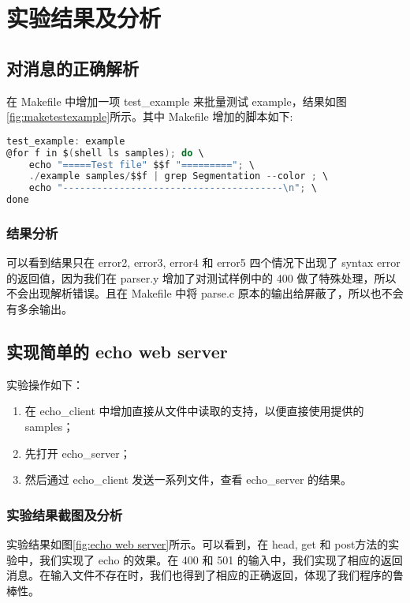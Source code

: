 

\chapter{实验结果及分析}

\section{对消息的正确解析}

在 Makefile 中增加一项 test\_example 来批量测试 example，结果如图\ref{fig:maketestexample}所示。其中 Makefile 增加的脚本如下:

\begin{lstlisting}[language=C, name={Makefile: test example}]
test_example: example
@for f in $(shell ls samples); do \
	echo "=====Test file" $$f "========="; \
	./example samples/$$f | grep Segmentation --color ; \
	echo "---------------------------------------\n"; \
done
\end{lstlisting}

\subsection{结果分析}

可以看到结果只在 error2, error3, error4 和 error5 四个情况下出现了 syntax error 的返回值，因为我们在 parser.y 增加了对测试样例中的 400 做了特殊处理，所以不会出现解析错误。且在 Makefile 中将 parse.c 原本的输出给屏蔽了，所以也不会有多余输出。

\section{实现简单的 echo web server}

实验操作如下：
\begin{enumerate}
    \item 在 echo\_client 中增加直接从文件中读取的支持，以便直接使用提供的 samples；
    \item 先打开 echo\_server；
    \item 然后通过 echo\_client 发送一系列文件，查看 echo\_server 的结果。
\end{enumerate}

\subsection{实验结果截图及分析}
实验结果如图\ref{fig:echo web server}所示。可以看到，在 head, get 和 post方法的实验中，我们实现了 echo 的效果。在 400 和 501 的输入中，我们实现了相应的返回消息。在输入文件不存在时，我们也得到了相应的正确返回，体现了我们程序的鲁棒性。

